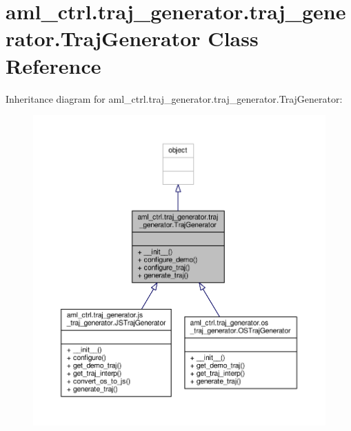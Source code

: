 \hypertarget{classaml__ctrl_1_1traj__generator_1_1traj__generator_1_1_traj_generator}{\section{aml\-\_\-ctrl.\-traj\-\_\-generator.\-traj\-\_\-generator.\-Traj\-Generator Class Reference}
\label{classaml__ctrl_1_1traj__generator_1_1traj__generator_1_1_traj_generator}
}


Inheritance diagram for aml\-\_\-ctrl.\-traj\-\_\-generator.\-traj\-\_\-generator.\-Traj\-Generator\-:\nopagebreak
\begin{figure}[H]
\begin{center}
\leavevmode
\includegraphics[width=350pt]{classaml__ctrl_1_1traj__generator_1_1traj__generator_1_1_traj_generator__inherit__graph}
\end{center}
\end{figure}


